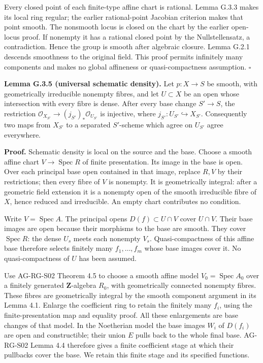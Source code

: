 \documentclass[11pt,a4paper,openany]{report}
\newcounter{none}
\begin{document}
Every closed point of each finite-type affine chart is rational. Lemma G.3.3 makes its local ring regular; the earlier rational-point Jacobian criterion makes that point smooth. The nonsmooth locus is closed on the chart by the earlier open-locus proof. If nonempty it has a rational closed point by the Nullstellensatz, a contradiction. Hence the group is smooth after algebraic closure. Lemma G.2.1 descends smoothness to the original field. This proof permits infinitely many components and makes no global affineness or quasi-compactness assumption. \(\square\)

\label{AG-RG-S08-universal-schematic-density}

\textbf{Lemma G.3.5 (universal schematic density).} Let \(p:X\to S\) be smooth, with geometrically irreducible nonempty fibres, and let \(U\subset X\) be an open whose intersection with every fibre is dense. After every base change \(S'\to S\), the restriction \(\mathcal O_{X_{S'}}\to (j_{S'})_*\mathcal O_{U_{S'}}\) is injective, where \(j_{S'}:U_{S'}\hookrightarrow X_{S'}\). Consequently two maps from \(X_{S'}\) to a separated \(S'\)-scheme which agree on \(U_{S'}\) agree everywhere.

\textbf{Proof.} Schematic density is local on the source and the base. Choose a smooth affine chart \(V\to\operatorname{Spec}R\) of finite presentation. Its image in the base is open. Over each principal base open contained in that image, replace \(R,V\) by their restrictions; then every fibre of \(V\) is nonempty. It is geometrically integral: after a geometric field extension it is a nonempty open of the smooth irreducible fibre of \(X\), hence reduced and irreducible. An empty chart contributes no condition.

Write \(V=\operatorname{Spec}A\). The principal opens \(D(f)\subset U\cap V\) cover \(U\cap V\). Their base images are open because their morphisms to the base are smooth. They cover \(\operatorname{Spec}R\): the dense \(U_s\) meets each nonempty \(V_s\). Quasi-compactness of this affine base therefore selects finitely many \(f_1,\ldots,f_m\) whose base images cover it. No quasi-compactness of \(U\) has been assumed.

Use AG-RG-S02 Theorem 4.5 to choose a smooth affine model \(V_0=\operatorname{Spec}A_0\) over a finitely generated \(\mathbf Z\)-algebra \(R_0\), with geometrically connected nonempty fibres. These fibres are geometrically integral by the smooth component argument in its Lemma 4.1. Enlarge the coefficient ring to retain the finitely many \(f_i\), using the finite-presentation map and equality proof. All these enlargements are base changes of that model. In the Noetherian model the base images \(W_i\) of \(D(f_i)\) are open and constructible; their union \(E\) pulls back to the whole final base. AG-RG-S02 Lemma 4.4 therefore gives a finite coefficient stage at which their pullbacks cover the base. We retain this finite stage and its specified functions.
\end{document}
